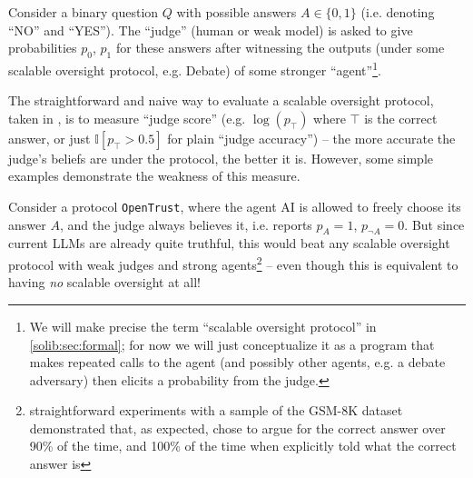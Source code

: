 Consider a binary question $Q$ with possible answers $A\in\{0, 1\}$ (i.e. denoting ``NO'' and ``YES''). The ``judge'' (human or weak model) is asked to give probabilities $p_0$, $p_1$ for these answers after witnessing the outputs (under some scalable oversight protocol, e.g. Debate) of some stronger ``agent''\footnote{We will make precise the term ``scalable oversight protocol'' in \cref{solib:sec:formal}; for now we will just conceptualize it as a program that makes repeated calls to the agent (and possibly other agents, e.g. a debate adversary) then elicits a probability from the judge.}.

The straightforward and naive way to evaluate a scalable oversight protocol, taken in \previouswork{}, is to measure ``judge score'' (e.g. $\log(p_\top)$ where $\top$ is the correct answer, or just $\mathbb{I}[p_\top>0.5]$ for plain ``judge accuracy'') -- the more accurate the judge's beliefs are under the protocol, the better it is. However, some simple examples demonstrate the weakness of this measure.

\begin{example}
    Consider a protocol \texttt{OpenTrust}, where the agent AI is allowed to freely choose its answer $A$, and the judge always believes it, i.e. reports $p_A=1$, $p_{\lnot A}=0$. But since current LLMs are already quite truthful, this would beat any scalable oversight protocol with weak judges and strong agents\footnote{straightforward experiments  with a sample of the GSM-8K dataset demonstrated that, as expected, \claudenewsonnet{} chose to argue for the correct answer over 90\% of the time, and 100\% of the time when explicitly told what the correct answer is} -- even though this is equivalent to having \emph{no} scalable oversight at all!
\end{example}

